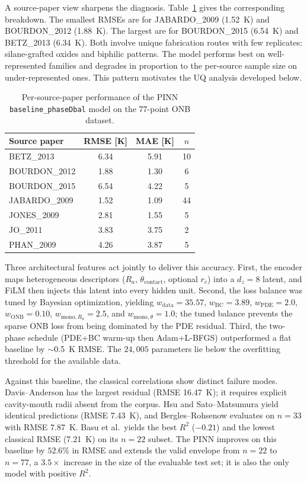 A source-paper view sharpens the diagnosis.
Table~\ref{tab:per_paper} gives the corresponding breakdown. The
smallest RMSEs are for JABARDO\_2009 (\SI{1.52}{K}) and BOURDON\_2012
(\SI{1.88}{K}). The largest are for BOURDON\_2015 (\SI{6.54}{K}) and
BETZ\_2013 (\SI{6.34}{K}). Both involve unique fabrication routes
with few replicates: silane-grafted oxides and biphilic patterns.
The model performs best on well-represented families and degrades
in proportion to the per-source sample size on under-represented
ones. This pattern motivates the UQ analysis developed below.

\begin{table}[!htbp]
\centering
\caption{Per-source-paper performance of the PINN
  \texttt{baseline\_phaseDbal} model on the 77-point ONB dataset.}
\label{tab:per_paper}
\small
\begin{tabular}{lccc}
\hline
Source paper & RMSE [K] & MAE [K] & $n$ \\
\hline
BETZ\_2013      & 6.34 & 5.91 & 10 \\
BOURDON\_2012   & 1.88 & 1.30 & 6 \\
BOURDON\_2015   & 6.54 & 4.22 & 5 \\
JABARDO\_2009   & 1.52 & 1.09 & 44 \\
JONES\_2009     & 2.81 & 1.55 & 5 \\
JO\_2011        & 3.83 & 3.75 & 2 \\
PHAN\_2009      & 4.26 & 3.87 & 5 \\
\hline
\end{tabular}
\end{table}

Three architectural features act jointly to deliver this accuracy.
First, the encoder maps heterogeneous descriptors ($R_a$,
$\theta_{\mathrm{contact}}$, optional $r_c$) into a $d_z=8$ latent,
and FiLM then injects this latent into every hidden unit. Second,
the loss balance was tuned by Bayesian optimization, yielding
$w_{\mathrm{data}}=35.57$, $w_{\mathrm{BC}}=3.89$,
$w_{\mathrm{PDE}}=2.0$, $w_{\mathrm{ONB}}=0.10$,
$w_{\mathrm{mono},R_a}=2.5$, and $w_{\mathrm{mono},\theta}=1.0$; the
tuned balance prevents the sparse ONB loss from being dominated by
the PDE residual. Third, the two-phase schedule (PDE+BC warm-up
then Adam+L-BFGS) outperformed a flat baseline by $\sim$\SI{0.5}{K}
RMSE. The $24{,}005$ parameters lie below the overfitting threshold
for the available data.

Against this baseline, the classical correlations show distinct
failure modes. Davis--Anderson has the largest residual (RMSE
\SI{16.47}{K}); it requires explicit cavity-mouth radii absent from
the corpus. Hsu and Sato--Matsumura yield identical predictions
(RMSE \SI{7.43}{K}), and Bergles--Rohsenow evaluates on $n=33$ with
RMSE \SI{7.87}{K}. Basu et al.\ yields the best $R^2$ ($-0.21$) and
the lowest classical RMSE (\SI{7.21}{K}) on its $n=22$ subset. The
PINN improves on this baseline by $52.6\%$ in RMSE and extends the
valid envelope from $n=22$ to $n=77$, a $3.5\times$ increase in the
size of the evaluable test set; it is also the only model with
positive $R^2$.

